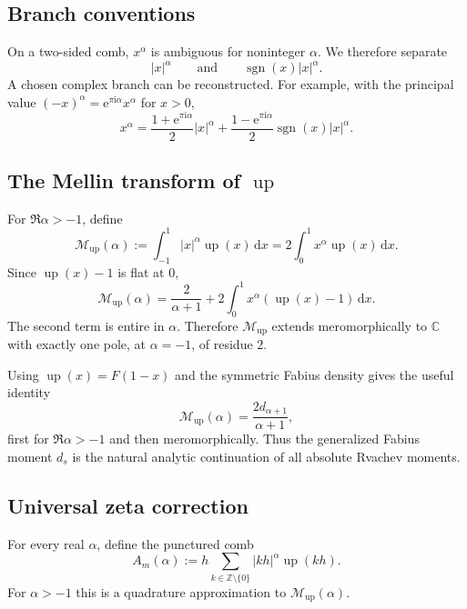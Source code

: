 \documentclass[11pt]{article}
\theoremstyle{definition}
\DeclareMathOperator{\sgn}{sgn}
\newcommand{\Up}{\operatorname{up}}
\newcommand{\dd}{\,\mathrm{d}}
\newcommand{\e}{\mathrm{e}}
\newcommand{\ii}{\mathrm{i}}
\newcommand{\Z}{\mathbb{Z}}
\newcommand{\C}{\mathbb{C}}
\newcommand{\Mell}{\mathcal{M}}
\begin{document}
\subsection{Branch conventions}

On a two-sided comb, $x^\alpha$ is ambiguous for noninteger $\alpha$.  We
therefore separate
\[
 |x|^\alpha
 \qquad\text{and}\qquad
 \sgn(x)|x|^\alpha.
\]
A chosen complex branch can be reconstructed.  For example, with the
principal value $(-x)^\alpha=\e^{\pi\ii\alpha}x^\alpha$ for $x>0$,
\begin{equation}
 x^\alpha
 =\frac{1+\e^{\pi\ii\alpha}}2|x|^\alpha
 +\frac{1-\e^{\pi\ii\alpha}}2\sgn(x)|x|^\alpha.
 \label{eq:branch-decomposition}
\end{equation}

\subsection{The Mellin transform of \texorpdfstring{$\Up$}{up}}

For $\Re\alpha>-1$, define
\begin{equation}
 \Mell_{\Up}(\alpha)
 :=\int_{-1}^{1}|x|^\alpha\Up(x)\dd x
 =2\int_0^1x^\alpha\Up(x)\dd x.
 \label{eq:Mellin-up}
\end{equation}
Since $\Up(x)-1$ is flat at $0$,
\begin{equation}
 \Mell_{\Up}(\alpha)
 =\frac{2}{\alpha+1}
 +2\int_0^1x^\alpha(\Up(x)-1)\dd x.
 \label{eq:Mellin-continuation}
\end{equation}
The second term is entire in $\alpha$.  Therefore $\Mell_{\Up}$ extends
meromorphically to $\C$ with exactly one pole, at $\alpha=-1$, of residue
$2$.

Using $\Up(x)=F(1-x)$ and the symmetric Fabius density gives the useful
identity
\begin{equation}
 \Mell_{\Up}(\alpha)=\frac{2d_{\alpha+1}}{\alpha+1},
 \label{eq:Mellin-d}
\end{equation}
first for $\Re\alpha>-1$ and then meromorphically.  Thus the generalized
Fabius moment $d_s$ is the natural analytic continuation of all absolute
Rvachev moments.

\subsection{Universal zeta correction}

For every real $\alpha$, define the punctured comb
\begin{equation}
 A_m(\alpha):=h\sum_{k\in\Z\setminus\{0\}}|kh|^\alpha\Up(kh).
 \label{eq:A-alpha}
\end{equation}
For $\alpha>-1$ this is a quadrature approximation to
$\Mell_{\Up}(\alpha)$.
\end{document}
